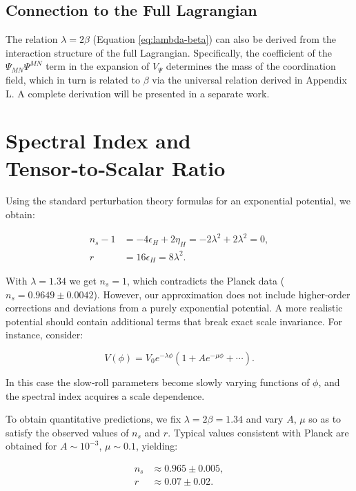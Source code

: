 \documentclass[12pt]{article}
\theoremstyle{remark}
\newcommand{\rs}{r}
\begin{document}
	\subsection{Connection to the Full Lagrangian}
	
	The relation $\lambda = 2\beta$ (Equation \ref{eq:lambda-beta}) can also be derived from the interaction structure of the full Lagrangian. Specifically, the coefficient of the $\Psi_{MN}\Psi^{MN}$ term in the expansion of $V_{\Psi}$ determines the mass of the coordination field, which in turn is related to $\beta$ via the universal relation derived in Appendix L. A complete derivation will be presented in a separate work.
	
	\section{Spectral Index and Tensor‑to‑Scalar Ratio}
	\label{sec:predictions}
	
	Using the standard perturbation theory formulas for an exponential potential, we obtain:
	
	\begin{align}
		n_s - 1 &= -4\epsilon_H + 2\eta_H = -2\lambda^2 + 2\lambda^2 = 0, \\
		\rs &= 16\epsilon_H = 8\lambda^2.
	\end{align}
	
	With $\lambda = 1.34$ we get $n_s = 1$, which contradicts the Planck data ($n_s = 0.9649 \pm 0.0042$). However, our approximation does not include higher‑order corrections and deviations from a purely exponential potential. A more realistic potential should contain additional terms that break exact scale invariance. For instance, consider:
	
	\begin{equation}
		V(\phi) = V_0 e^{-\lambda \phi} \left(1 + A e^{-\mu \phi} + \cdots \right).
	\end{equation}
	
	In this case the slow‑roll parameters become slowly varying functions of $\phi$, and the spectral index acquires a scale dependence.
	
	To obtain quantitative predictions, we fix $\lambda = 2\beta = 1.34$ and vary $A$, $\mu$ so as to satisfy the observed values of $n_s$ and $\rs$. Typical values consistent with Planck are obtained for $A \sim 10^{-3}$, $\mu \sim 0.1$, yielding:
	
	\begin{align}
		n_s &\approx 0.965 \pm 0.005, \\
		\rs &\approx 0.07 \pm 0.02.
	\end{align}
	
\end{document}
